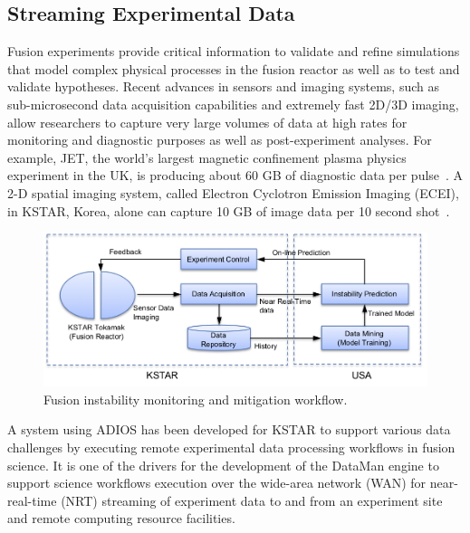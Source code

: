 \documentclass[x11names,table,xcdraw,graybox]{svmult}
\begin{document}
\subsection{Streaming Experimental Data}

Fusion experiments provide critical information to validate and refine simulations that model complex physical processes in the fusion reactor as well as to test and validate hypotheses.
Recent advances in sensors and imaging systems, such as sub-microsecond data acquisition capabilities and extremely fast 2D/3D imaging, allow researchers to capture very large volumes of data at high rates for monitoring and diagnostic purposes as well as post-experiment analyses. For example, JET, the world's largest magnetic confinement plasma physics experiment in the UK, is producing about 60 GB of diagnostic data per pulse~\cite{farthing2006data}. A 2-D spatial imaging system, called Electron Cyclotron Emission Imaging (ECEI), in KSTAR, Korea, alone can capture 10 GB of image data per 10 second shot~\cite{yun2010development}.

\begin{figure}[b]
\sidecaption
\includegraphics[width=1\linewidth]{figures/kstar-workflow.png}
\caption{Fusion instability monitoring and mitigation workflow.}
\label{ch10:fig:fusion_workflow}
\end{figure}

A system using ADIOS has been developed for KSTAR to support various data challenges by executing remote experimental data processing workflows in fusion science. It is one of the drivers for the development of the DataMan engine to support science workflows execution over the wide-area network (WAN) for near-real-time (NRT) streaming of experiment data to and from an experiment site and remote computing resource facilities.
\end{document}
